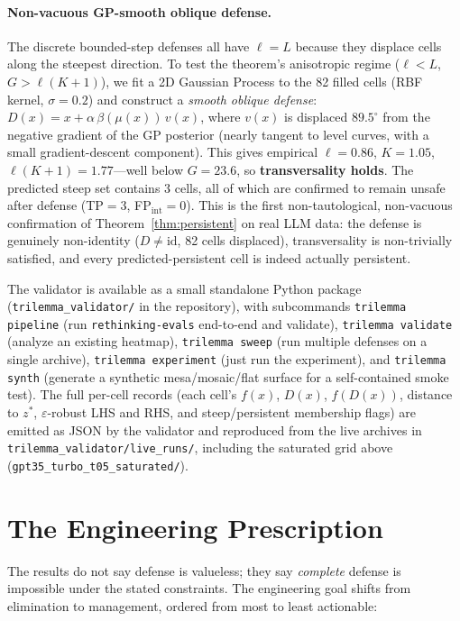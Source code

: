 \documentclass[11pt]{article}
\begin{document}
\paragraph{Non-vacuous GP-smooth oblique defense.}
The discrete bounded-step defenses all have $\ell = L$ because
they displace cells along the steepest direction. To test the
theorem's anisotropic regime ($\ell < L$, $G > \ell(K{+}1)$), we
fit a 2D Gaussian Process to the 82 filled cells (RBF kernel,
$\sigma = 0.2$) and construct a \emph{smooth oblique defense}:
$D(x) = x + \alpha\,\beta(\mu(x))\,v(x)$, where $v(x)$ is
displaced $89.5^\circ$ from the negative gradient of the GP
posterior (nearly tangent to level curves, with a small gradient-descent
component). This gives empirical $\ell = 0.86$, $K = 1.05$,
$\ell(K{+}1) = 1.77$---well below $G = 23.6$, so
\textbf{transversality holds}. The predicted steep set contains
$3$ cells, all of which are confirmed to remain unsafe after
defense (TP${} = 3$, FP${}_{\text{int}} = 0$). This is the
first non-tautological, non-vacuous confirmation of
Theorem~\ref{thm:persistent} on real LLM data: the defense is
genuinely non-identity ($D \neq \mathrm{id}$, 82 cells displaced),
transversality is non-trivially satisfied, and every
predicted-persistent cell is indeed actually persistent.

The validator is available as a small standalone Python package
(\texttt{trilemma\_validator/} in the repository), with subcommands
\texttt{trilemma pipeline} (run \texttt{rethinking-evals} end-to-end
and validate), \texttt{trilemma validate} (analyze an existing
heatmap), \texttt{trilemma sweep} (run multiple defenses on a single
archive), \texttt{trilemma experiment} (just run the experiment),
and \texttt{trilemma synth} (generate a synthetic
mesa/mosaic/flat surface for a self-contained smoke test). The full
per-cell records (each cell's $f(x)$, $D(x)$, $f(D(x))$, distance
to $z^{*}$, $\varepsilon$-robust LHS and RHS, and steep/persistent
membership flags) are emitted as JSON by the validator and
reproduced from the live archives in
\texttt{trilemma\_validator/live\_runs/}, including the saturated
grid above (\texttt{gpt35\_turbo\_t05\_saturated/}).


\section{The Engineering Prescription}
\label{sec:engineering}

The results do not say defense is valueless; they say \emph{complete}
defense is impossible under the stated constraints. The engineering
goal shifts from elimination to management, ordered from most to least
actionable:
\end{document}
